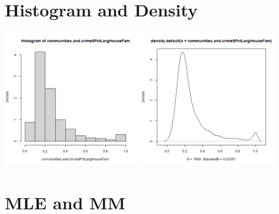 \documentclass[12pt, letterpaper]{report}
\begin{document}
\section{Histogram and Density}


\begin{center}
\includegraphics[width=0.45\textwidth]{exponential/PctLargHouseFam_hist}
\includegraphics[width=0.45\textwidth]{exponential/PctLargHouseFam_density}
\end{center}

\section{MLE and MM}
\end{document}
